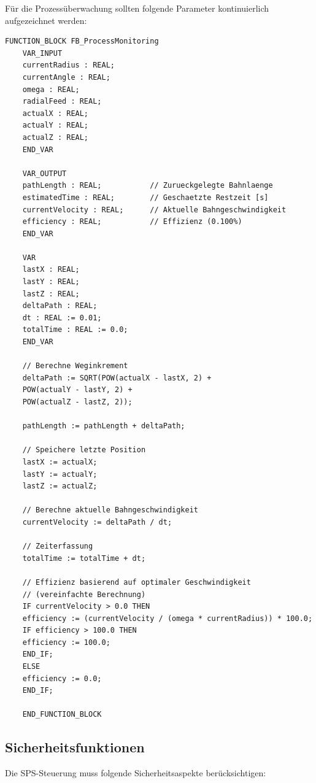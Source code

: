 ﻿\documentclass[12pt,a4paper]{article}
\begin{document}
Für die Prozessüberwachung sollten folgende Parameter kontinuierlich aufgezeichnet werden:

\begin{lstlisting}[style=structuredtext, caption={Monitoring-Funktionsbaustein}, label={lst:monitor}]
	FUNCTION_BLOCK FB_ProcessMonitoring
	VAR_INPUT
	currentRadius : REAL;
	currentAngle : REAL;
	omega : REAL;
	radialFeed : REAL;
	actualX : REAL;
	actualY : REAL;
	actualZ : REAL;
	END_VAR
	
	VAR_OUTPUT
	pathLength : REAL;           // Zurueckgelegte Bahnlaenge
	estimatedTime : REAL;        // Geschaetzte Restzeit [s]
	currentVelocity : REAL;      // Aktuelle Bahngeschwindigkeit
	efficiency : REAL;           // Effizienz (0.100%)
	END_VAR
	
	VAR
	lastX : REAL;
	lastY : REAL;
	lastZ : REAL;
	deltaPath : REAL;
	dt : REAL := 0.01;
	totalTime : REAL := 0.0;
	END_VAR
	
	// Berechne Weginkrement
	deltaPath := SQRT(POW(actualX - lastX, 2) + 
	POW(actualY - lastY, 2) + 
	POW(actualZ - lastZ, 2));
	
	pathLength := pathLength + deltaPath;
	
	// Speichere letzte Position
	lastX := actualX;
	lastY := actualY;
	lastZ := actualZ;
	
	// Berechne aktuelle Bahngeschwindigkeit
	currentVelocity := deltaPath / dt;
	
	// Zeiterfassung
	totalTime := totalTime + dt;
	
	// Effizienz basierend auf optimaler Geschwindigkeit
	// (vereinfachte Berechnung)
	IF currentVelocity > 0.0 THEN
	efficiency := (currentVelocity / (omega * currentRadius)) * 100.0;
	IF efficiency > 100.0 THEN
	efficiency := 100.0;
	END_IF;
	ELSE
	efficiency := 0.0;
	END_IF;
	
	END_FUNCTION_BLOCK
\end{lstlisting}

\subsection{Sicherheitsfunktionen}

Die SPS-Steuerung muss folgende Sicherheitsaspekte berücksichtigen:
\end{document}
